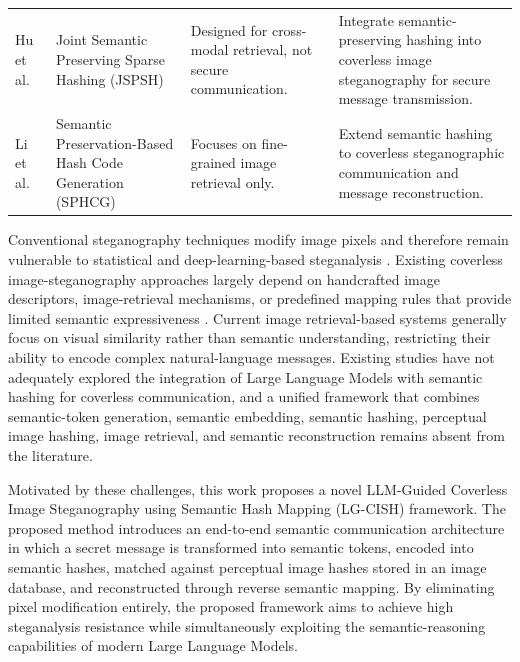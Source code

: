\documentclass[11pt]{article}
\theoremstyle{definition}
\begin{document}
\begin{table}[H]
\begin{tabular}{@{}p{2.05cm}p{2.55cm}p{4.05cm}p{4.35cm}@{}}
Hu et al.\ \cite{huJSPSH} & Joint Semantic Preserving Sparse Hashing (JSPSH) & Designed for cross-modal retrieval, not secure communication. & Integrate semantic-preserving hashing into coverless image steganography for secure message transmission. \\
Li et al.\ \cite{liSPHCG} & Semantic Preservation-Based Hash Code Generation (SPHCG) & Focuses on fine-grained image retrieval only. & Extend semantic hashing to coverless steganographic communication and message reconstruction. \\
\bottomrule
\end{tabular}
\end{table}

Conventional steganography techniques modify image pixels and therefore remain
vulnerable to statistical and deep-learning-based steganalysis \cite{mandal,mengReview,huJSPSH}. Existing
coverless image-steganography approaches largely depend on handcrafted image
descriptors, image-retrieval mechanisms, or predefined mapping rules that provide
limited semantic expressiveness \cite{kadhim,kheddar}. Current image retrieval-based systems
generally focus on visual similarity rather than semantic understanding, restricting
their ability to encode complex natural-language messages. Existing studies have not
adequately explored the integration of Large Language Models with semantic hashing
for coverless communication, and a unified framework that combines semantic-token
generation, semantic embedding, semantic hashing, perceptual image hashing, image
retrieval, and semantic reconstruction remains absent from the literature.

Motivated by these challenges, this work proposes a novel LLM-Guided Coverless Image
Steganography using Semantic Hash Mapping (LG-CISH) framework. The proposed method
introduces an end-to-end semantic communication architecture in which a secret
message is transformed into semantic tokens, encoded into semantic hashes, matched
against perceptual image hashes stored in an image database, and reconstructed
through reverse semantic mapping. By eliminating pixel modification entirely, the
proposed framework aims to achieve high steganalysis resistance while simultaneously
exploiting the semantic-reasoning capabilities of modern Large Language Models.
\end{document}

